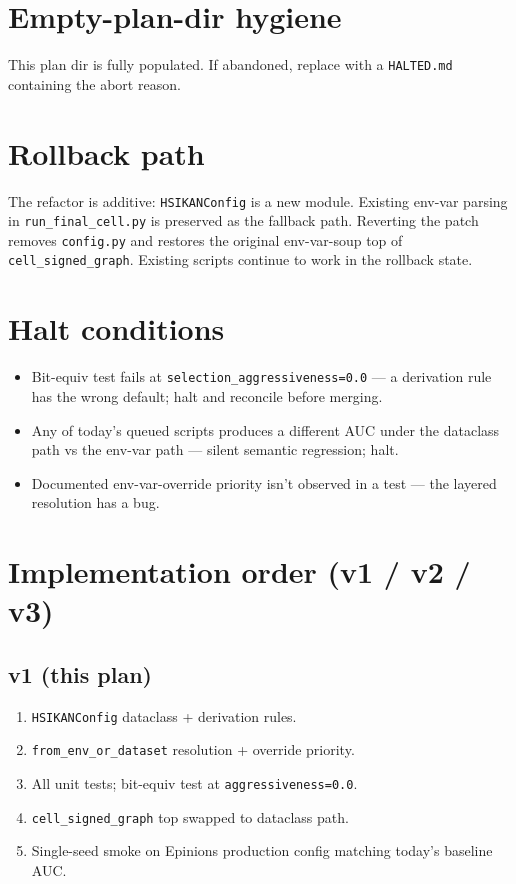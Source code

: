\documentclass[11pt,a4paper]{article}
\begin{document}
\section{Empty-plan-dir hygiene}
This plan dir is fully populated.  If abandoned, replace with a
\texttt{HALTED.md} containing the abort reason.

\section{Rollback path}
The refactor is additive: \texttt{HSIKANConfig} is a new module.
Existing env-var parsing in \texttt{run\_final\_cell.py} is preserved as
the fallback path.  Reverting the patch removes \texttt{config.py} and
restores the original env-var-soup top of \texttt{cell\_signed\_graph}.
Existing scripts continue to work in the rollback state.

\section{Halt conditions}
\begin{itemize}
\item Bit-equiv test fails at \texttt{selection\_aggressiveness=0.0}
  --- a derivation rule has the wrong default; halt and reconcile
  before merging.
\item Any of today's queued scripts produces a different AUC under the
  dataclass path vs the env-var path --- silent semantic regression;
  halt.
\item Documented env-var-override priority isn't observed in a test
  --- the layered resolution has a bug.
\end{itemize}

\section{Implementation order (v1 / v2 / v3)}

\subsection*{v1 (this plan)}
\begin{enumerate}
\item \texttt{HSIKANConfig} dataclass + derivation rules.
\item \texttt{from\_env\_or\_dataset} resolution + override priority.
\item All unit tests; bit-equiv test at \texttt{aggressiveness=0.0}.
\item \texttt{cell\_signed\_graph} top swapped to dataclass path.
\item Single-seed smoke on Epinions production config matching today's
  baseline AUC.
\end{enumerate}
\end{document}
